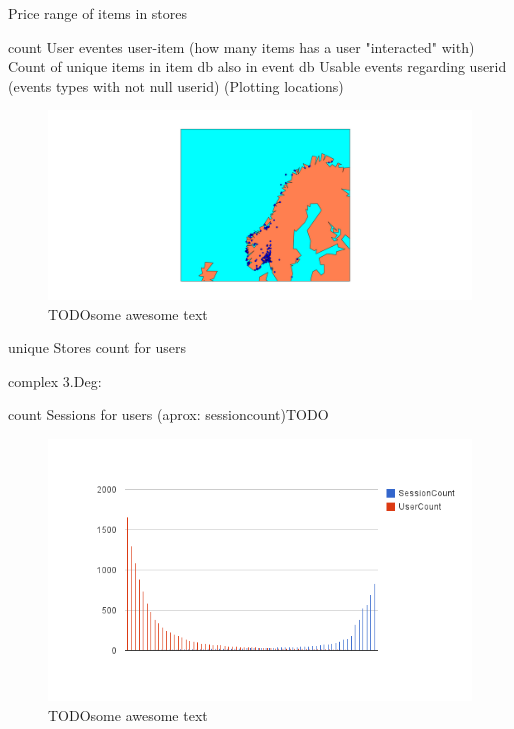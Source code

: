             Price range of items in stores



            count User eventes
            user-item (how many items has a user "interacted" with)
            Count of unique items in item db also in event db
            Usable events regarding userid (events types with not null userid)
            (Plotting locations)

    \begin{figure}[H]
        \includegraphics[width=5in]{image/simpleGeoPlot.png}
        \centering
        \caption[Simple plotting of event location]{TODOsome awesome text}
    \end{figure}


            unique Stores count for users

        complex 3.Deg:

            count Sessions for users (aprox: sessioncount)TODO

    \begin{figure}[H]
        \includegraphics[width=5in]{image/global_sessioncount.png}
        \centering
        \caption[Count of sessions per user mapped with count of user with give
        session amount]{TODOsome awesome text}
    \end{figure}

